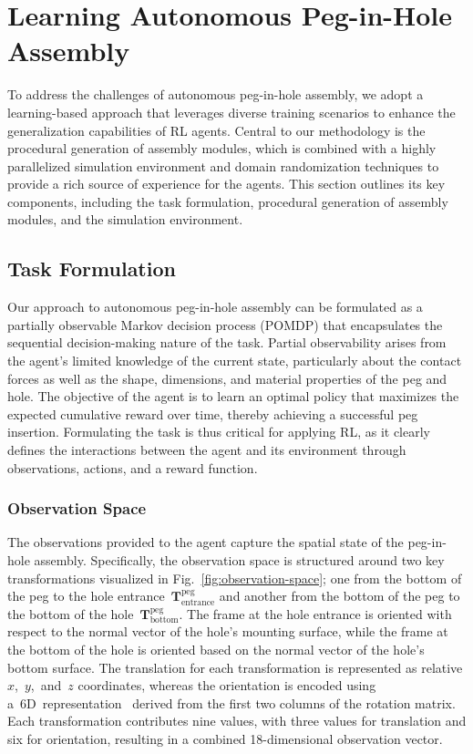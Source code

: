 \section{Learning Autonomous Peg-in-Hole Assembly}\label{sec:learning-autonomous-peg-in-hole-assembly}

To address the challenges of autonomous peg-in-hole assembly, we adopt a learning-based approach that leverages diverse training scenarios to enhance the generalization capabilities of RL agents. Central to our methodology is the procedural generation of assembly modules, which is combined with a highly parallelized simulation environment and domain randomization techniques to provide a rich source of experience for the agents. This section outlines its key components, including the task formulation, procedural generation of assembly modules, and the simulation environment.


\subsection{Task Formulation}\label{ssec:task-formulation}

Our approach to autonomous peg-in-hole assembly can be formulated as a partially observable Markov decision process (POMDP) that encapsulates the sequential decision-making nature of the task. Partial observability arises from the agent's limited knowledge of the current state, particularly about the contact forces as well as the shape, dimensions, and material properties of the peg and hole. The objective of the agent is to learn an optimal policy that maximizes the expected cumulative reward over time, thereby achieving a successful peg insertion. Formulating the task is thus critical for applying RL, as it clearly defines the interactions between the agent and its environment through observations, actions, and a reward function.


\subsubsection*{Observation Space}\label{sssec:observation-space}

The observations provided to the agent capture the spatial state of the peg-in-hole assembly. Specifically, the observation space is structured around two key transformations visualized in Fig.~\ref{fig:observation-space}; one from the bottom of the peg to the hole entrance~\(\mathbf{T}_{\text{entrance}}^{\text{peg}}\) and another from the bottom of the peg to the bottom of the hole~\(\mathbf{T}_{\text{bottom}}^{\text{peg}}\). The frame at the hole entrance is oriented with respect to the normal vector of the hole's mounting surface, while the frame at the bottom of the hole is oriented based on the normal vector of the hole's bottom surface. The translation for each transformation is represented as relative \(x\),~\(y\),~and~\(z\) coordinates, whereas the orientation is encoded using a~6D~representation~\cite{zhou2019continuity} derived from the first two columns of the rotation matrix. Each transformation contributes nine values, with three values for translation and six for orientation, resulting in a combined 18-dimensional observation vector.

